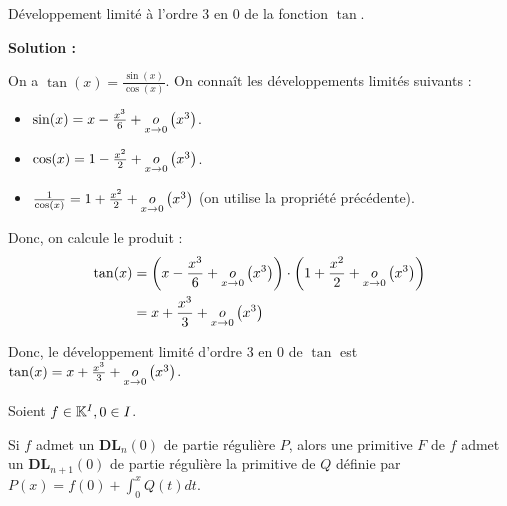 \documentclass[12pt, a4paper]{report}
\begin{document}
\begin{example}
    Développement limité à l'ordre 3 en 0 de la fonction $\tan$.

    \textbf{Solution :}

    On a $\tan(x) = \frac{\sin(x)}{\cos(x)}$.
    On connaît les développements limités suivants :
    \begin{itemize}
        \item $\sin(x) = x - \frac{x^3}{6} + \underset{x\to0}{o}\left(x^3\right)$.
        \item $\cos(x) = 1 - \frac{x^2}{2} + \underset{x\to0}{o}\left(x^3\right)$.
        \item $\frac{1}{\cos(x)} = 1 + \frac{x^2}{2} + \underset{x\to0}{o}\left(x^3\right)$ (on utilise la propriété précédente).
    \end{itemize}

    Donc, on calcule le produit :
    \begin{align*}
        \tan(x) &= \left(x - \frac{x^3}{6} + \underset{x\to0}{o}\left(x^3\right)\right) \cdot \left(1 + \frac{x^2}{2} + \underset{x\to0}{o}\left(x^3\right)\right)\\
        &= x + \frac{x^3}{3} + \underset{x\to0}{o}\left(x^3\right)
    \end{align*}

    Donc, le développement limité d'ordre 3 en 0 de $\tan$ est $\tan(x) = x + \frac{x^3}{3} + \underset{x\to0}{o}\left(x^3\right)$.
\end{example}

\begin{property}
    Soient $f \in \mathbb{K}^I, 0 \in I$.

    Si $f$ admet un $\mathbf{DL}_n(0)$ de partie régulière $P$, alors une primitive $F$ de $f$ admet un $\mathbf{DL}_{n+1}(0)$ de partie régulière la primitive de $Q$ définie par $P(x) = f(0) + \int_0^x Q(t) dt$.
\end{property}
\end{document}
